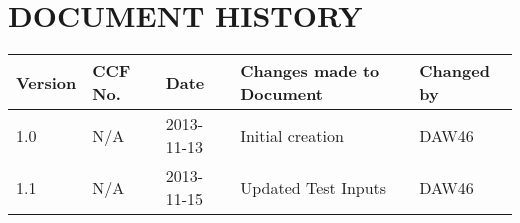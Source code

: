 \documentclass{project}
\begin{document}



\section*{DOCUMENT HISTORY}
\begin{flushleft}
\begin{tabular}{ | p{1.5cm} | p{1cm} | p{2cm} | p{6cm}| p{1.5cm}| }
\hline
Version & CCF No. & Date & Changes made to Document & Changed by \\
\hline

1.0 & N/A & 2013-11-13 & Initial creation & DAW46 \\ \hline
1.1 & N/A & 2013-11-15 & Updated Test Inputs & DAW46 \\ 
\hline

\end{tabular}
\end{flushleft}
\label{thelastpage}
\end{document}
